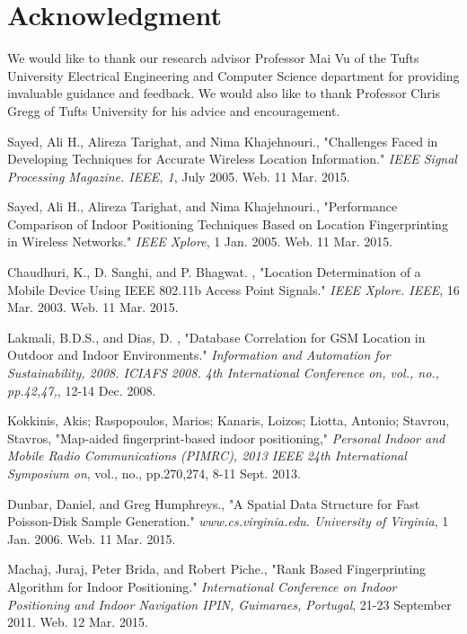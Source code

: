 \documentclass[conference]{IEEEtran}
\begin{document}
\section*{Acknowledgment}
We would like to thank our research advisor Professor Mai Vu of the Tufts University Electrical Engineering and Computer Science department for providing invaluable guidance and feedback. We would also like to thank Professor Chris Gregg of Tufts University for his advice and encouragement.



\begin{thebibliography}{99}

 Sayed, Ali H., Alireza Tarighat, and Nima Khajehnouri.,
"Challenges Faced in Developing Techniques for Accurate Wireless Location Information."
\emph{IEEE Signal Processing Magazine. IEEE, 1}, July 2005. Web. 11 Mar. 2015.
 
 Sayed, Ali H., Alireza Tarighat, and Nima Khajehnouri.,
"Performance Comparison of Indoor Positioning Techniques Based on Location Fingerprinting in Wireless Networks."
\emph{IEEE Xplore}, 1 Jan. 2005. Web. 11 Mar. 2015. 
 
 Chaudhuri, K., D. Sanghi, and P. Bhagwat. ,
"Location Determination of a Mobile Device Using IEEE 802.11b Access Point Signals."
\emph{IEEE Xplore. IEEE}, 16 Mar. 2003. Web. 11 Mar. 2015.

 Lakmali, B.D.S., and Dias, D. ,
"Database Correlation for GSM Location in Outdoor and Indoor Environments."
\emph{Information and Automation for Sustainability, 2008. ICIAFS 2008. 4th International Conference on, vol., no., pp.42,47,}, 12-14 Dec. 2008.
 
 Kokkinis, Akis; Raspopoulos, Marios; Kanaris, Loizos; Liotta, Antonio; Stavrou, Stavros,
"Map-aided fingerprint-based indoor positioning,"
\emph{Personal Indoor and Mobile Radio Communications (PIMRC), 2013 IEEE 24th International Symposium on}, vol., no., pp.270,274, 8-11 Sept. 2013.

 Dunbar, Daniel, and Greg Humphreys.,
"A Spatial Data Structure for Fast Poisson-Disk Sample Generation."
\emph{www.cs.virginia.edu. University of Virginia},  1 Jan. 2006. Web. 11 Mar. 2015. 

 Machaj, Juraj, Peter Brida, and Robert Piche.,
"Rank Based Fingerprinting Algorithm for Indoor Positioning."
\emph{ International Conference on Indoor Positioning and Indoor Navigation IPIN, Guimaraes, Portugal},  21-23 September 2011. Web. 12 Mar. 2015.


\end{thebibliography}
\end{document}
